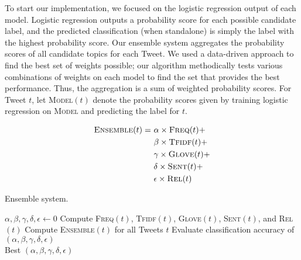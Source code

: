 \documentclass[11pt]{article}
\begin{document}
To start our implementation, we focused on the logistic regression output of each model. Logistic regression outputs a probability score for each possible candidate label, and the predicted classification (when standalone) is simply the label with the highest probability score. Our ensemble system aggregates the probability scores of all candidate topics for each Tweet. We used a data-driven approach to find the best set of weights possible; our algorithm methodically tests various combinations of weights on each model to find the set that provides the best performance. Thus, the aggregation is a sum of weighted probability scores. For Tweet $t$, let \textsc{Model}$(t)$ denote the probability scores given by training logistic regression on \textsc{Model} and predicting the label for $t$.

\begin{align}
\textsc{Ensemble}(t) =\ &\alpha \times \textsc{Freq}(t) +\\
&\beta \times \textsc{Tfidf}(t) +\\
&\gamma \times \textsc{Glove}(t) +\\
&\delta \times \textsc{Sent}(t) +\\
&\epsilon \times \textsc{Rel}(t)
\end{align}

\begin{algorithm*}
  \caption{Ensemble system.}\label{ntc}
  \begin{algorithmic}[1]
    \State $\alpha, \beta, \gamma, \delta, \epsilon \gets 0$
      \State Compute \textsc{Freq}$(t)$, \textsc{Tfidf}$(t)$, \textsc{Glove}$(t)$, \textsc{Sent}$(t)$, and \textsc{Rel}$(t)$
    \EndFor
              \State Compute \textsc{Ensemble}$(t)$ for all Tweets $t$
              \State Evaluate classification accuracy of $(\alpha,\beta,\gamma,\delta,\epsilon)$
            \EndFor
          \EndFor
        \EndFor
      \EndFor
    \EndFor\\
    \Return Best $(\alpha,\beta,\gamma,\delta,\epsilon)$
  \end{algorithmic}
\end{algorithm*}
\end{document}
